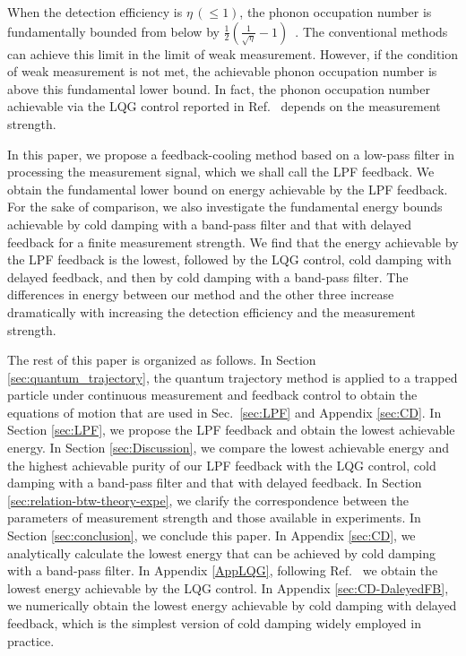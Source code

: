 \documentclass[aps,pra,superscriptaddress,twocolumn
]{revtex4-2}
\newcommand{\majrev}[1]{{#1}}
\begin{document}
 
 
 
 When the detection efficiency is $\eta\, (\leqslant 1)$, 
 the phonon occupation number is fundamentally bounded from below by 
 $\frac{1}{2}(\frac{1}{\sqrt{\eta}} -1)$~\cite{doherty2012quantum,bowen2015quantum}. 
{The conventional methods can achieve this limit in the limit of weak measurement. 
 However, if the condition of weak measurement is not met,  
 the achievable phonon occupation number is above}
 this fundamental lower bound. 
 In fact, the phonon occupation number achievable via the LQG control
 reported in Ref.~\cite{PhysRevA.60.2700} 
 depends on the measurement strength. 
 
 
 

 In this paper, we propose a feedback-cooling method 
 based on a low-pass filter in processing the measurement signal, 
 which we shall call the LPF feedback.
 We obtain the fundamental lower bound on energy achievable by the LPF feedback. 
 For the sake of comparison, 
 we also investigate the fundamental energy {bounds} 
 achievable by {cold damping with a band-pass filter and that with delayed feedback}
 for a finite measurement strength. 
 We find that the energy achievable by the LPF feedback is the lowest,
 followed by the LQG control, {cold damping with delayed feedback,
 and then by cold damping with a band-pass filter}. 
 The differences in energy between our method and the other {three} 
 increase 
 dramatically with increasing the detection efficiency and the measurement strength.
 
 

 
 
 The rest of this paper is organized as follows.
 In Section \ref{sec:quantum_trajectory}, 
 the quantum trajectory method is applied to a trapped particle under continuous measurement and feedback control 
 to obtain the equations of motion that are used in Sec.~\ref{sec:LPF} and Appendix \ref{sec:CD}.
 In Section \ref{sec:LPF}, we propose the LPF feedback
 and obtain the lowest achievable energy.
 In Section \ref{sec:Discussion}, we compare the lowest achievable energy 
 \majrev{and the highest achievable purity}
 of our LPF feedback with the LQG control{, cold damping with a band-pass filter 
 and that with delayed feedback}.
 \majrev{In Section \ref{sec:relation-btw-theory-expe}, 
 we clarify the correspondence between 
 the parameters of measurement strength and those available in experiments.}
 In Section \ref{sec:conclusion}, we conclude this paper.
 In Appendix \ref{sec:CD}, we analytically calculate the lowest energy that can be achieved 
 by cold damping {with a band-pass filter}.
 {In Appendix \ref{AppLQG}, following Ref.~\cite{PhysRevA.60.2700} 
 we obtain the lowest energy achievable by the LQG control.
 In Appendix \ref{sec:CD-DaleyedFB}, 
 we numerically obtain the lowest energy achievable by cold damping with delayed feedback, 
 which is the simplest version of cold damping widely employed in practice.}
 
\end{document}
